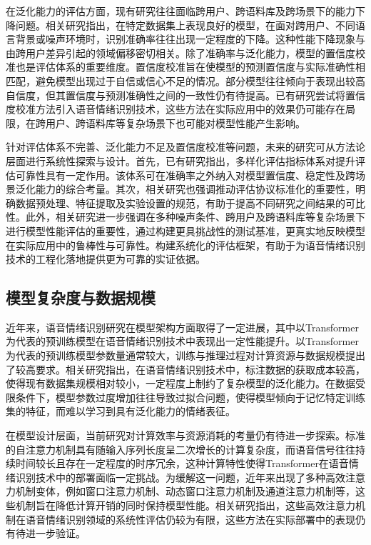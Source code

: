 在泛化能力的评估方面，现有研究往往面临跨用户、跨语料库及跨场景下的能力下降问题。相关研究指出，在特定数据集上表现良好的模型，在面对跨用户、不同语言背景或噪声环境时，识别准确率往往出现一定程度的下降。这种性能下降现象与由跨用户差异引起的领域偏移密切相关\cite{leem2024selective,su2023unsupervised,prabhu2024end,lu2022domain}。除了准确率与泛化能力，模型的置信度校准也是评估体系的重要维度。置信度校准旨在使模型的预测置信度与实际准确性相匹配，避免模型出现过于自信或信心不足的情况。部分模型往往倾向于表现出较高自信度，但其置信度与预测准确性之间的一致性仍有待提高\cite{liu2023dualrobustness,mao2022enhancing}。已有研究尝试将置信度校准方法引入语音情绪识别技术，这些方法在实际应用中的效果仍可能存在局限，在跨用户、跨语料库等复杂场景下也可能对模型性能产生影响\cite{lin2023chunk}。

针对评估体系不完善、泛化能力不足及置信度校准等问题，未来的研究可从方法论层面进行系统性探索与设计。首先，已有研究指出，多样化评估指标体系对提升评估可靠性具有一定作用\cite{mao2022enhancing,liu2023dualrobustness,ma2023review}。该体系可在准确率之外纳入对模型置信度、稳定性及跨场景泛化能力的综合考量。其次，相关研究也强调推动评估协议标准化的重要性，明确数据预处理、特征提取及实验设置的规范，有助于提高不同研究之间结果的可比性。此外，相关研究进一步强调在多种噪声条件、跨用户及跨语料库等复杂场景下进行模型性能评估的重要性，通过构建更具挑战性的测试基准，更真实地反映模型在实际应用中的鲁棒性与可靠性。构建系统化的评估框架，有助于为语音情绪识别技术的工程化落地提供更为可靠的实证依据。


\subsection{模型复杂度与数据规模}

近年来，语音情绪识别研究在模型架构方面取得了一定进展，其中以Transformer为代表的预训练模型在语音情绪识别技术中表现出一定性能提升\cite{liu2023dualrobustness,chen2023dwformer,wang2024swin}。以Transformer为代表的预训练模型参数量通常较大，训练与推理过程对计算资源与数据规模提出了较高要求。相关研究指出，在语音情绪识别技术中，标注数据的获取成本较高，使得现有数据集规模相对较小，一定程度上制约了复杂模型的泛化能力\cite{prabhu2024end,peng2021efficient,sampath2025efficient}。在数据受限条件下，模型参数过度增加往往导致过拟合问题，使得模型倾向于记忆特定训练集的特征，而难以学习到具有泛化能力的情绪表征\cite{mao2022enhancing,lin2023chunk}。

在模型设计层面，当前研究对计算效率与资源消耗的考量仍有待进一步探索\cite{leem2024selective,ahn2025multitask}。标准的自注意力机制具有随输入序列长度呈二次增长的计算复杂度，而语音信号往往持续时间较长且存在一定程度的时序冗余，这种计算特性使得Transformer在语音情绪识别技术中的部署面临一定挑战\cite{liu2023dualrobustness,chen2023dwformer,wang2024swin}。为缓解这一问题，近年来出现了多种高效注意力机制变体，例如窗口注意力机制、动态窗口注意力机制及通道注意力机制等，这些机制旨在降低计算开销的同时保持模型性能\cite{peng2021efficient,hao2024channel,he2023multiple}。相关研究指出，这些高效注意力机制在语音情绪识别领域的系统性评估仍较为有限，这些方法在实际部署中的表现仍有待进一步验证。


